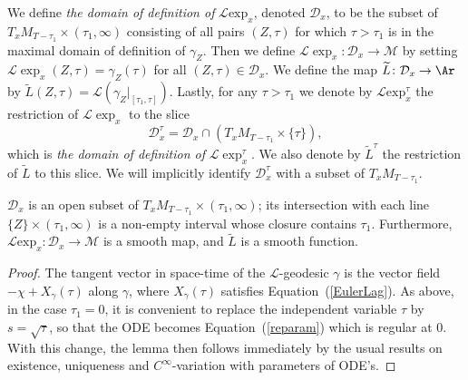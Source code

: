 \begin{definition}\label{def:l-exponential-map}
\label{defnD}
We define {\em the domain of definition of} ${\mathcal L}\mathrm{exp}_x$,  denoted ${\mathcal D}_x$, to be the
subset of $T_xM_{T-\tau_1}\times (\tau_1,\infty)$ consisting of all pairs
$(Z,\tau)$ for which $\tau> \tau_1$ is in the maximal domain of definition of
$\gamma_Z$.  Then we define $\mathcal{L}\exp_{x}\colon {\mathcal D}_x\to
{\mathcal M}$ by setting $\mathcal{L}\exp_{x}(Z,\tau) = \gamma_{Z}(\tau)$
for all $(Z,\tau)\in {\mathcal D}_x$. We
define the map $\widetilde L\colon {\mathcal D}_x\to \Ar$
by $\widetilde L(Z,\tau)={\mathcal L}\left(\gamma_Z|_{[\tau_1,\tau]}\right)$.
Lastly, for any $\tau> \tau_1$ we denote by ${\mathcal L}\mathrm{exp}_x^\tau$ the restriction of
${\mathcal L}\exp_x$ to the slice
$${\mathcal
D}^\tau_x={\mathcal D}_x\cap \left(T_xM_{T-\tau_1}\times \{\tau\}\right),$$
which is {\em the domain of definition of} ${\mathcal L}\exp_x^\tau$. We
also denote by  $\widetilde L^\tau$ the
restriction of $\widetilde L$ to this slice. We will implicitly identify
${\mathcal D}_x^\tau$ with a subset of $T_xM_{T-\tau_1}$.
\end{definition}



\begin{lemma}\label{lem:l-exponential-smooth}
\label{lcdiffeo}
${\mathcal D}_x$ is an open subset of $T_xM_{T-\tau_1}\times (\tau_1,\infty)$;
its intersection with each line $\{Z\}\times (\tau_1,\infty)$ is a non-empty
interval whose closure contains $\tau_1$. Furthermore, ${\mathcal L}\mathrm{exp}_x\colon {\mathcal D}_x\to {\mathcal M}$ is a smooth map, and $\widetilde
L$ is a smooth function.
\end{lemma}

\begin{proof}
\sketch
{}
The tangent vector in space-time of  the ${\mathcal L}$-geodesic
$\gamma$ is the vector field $-\chi+X_\gamma(\tau)$ along $\gamma$,
where $X_\gamma(\tau)$ satisfies Equation~(\ref{EulerLag}). As
above, in the case $\tau_1=0$, it is convenient to replace the
independent variable $\tau$ by $s=\sqrt{\tau}$, so that the ODE
becomes Equation~(\ref{reparam}) which is regular at $0$. With this
change, the lemma then follows immediately by the usual results on
existence, uniqueness and $C^\infty$-variation with parameters of
ODE's.
\end{proof}


